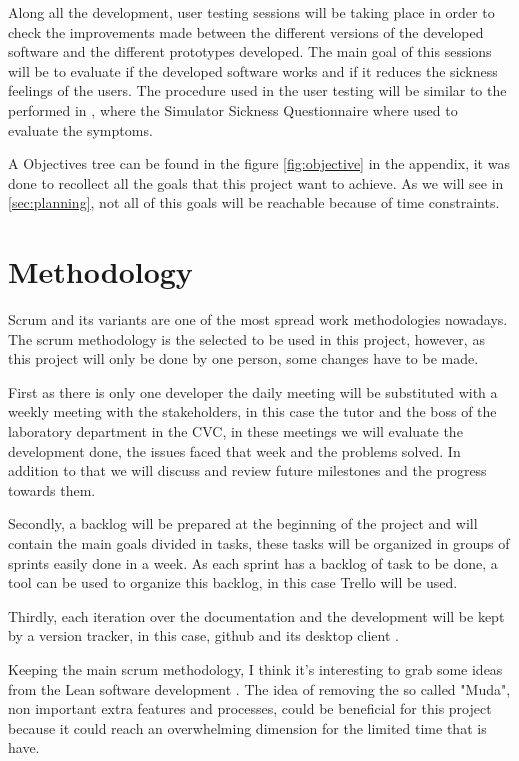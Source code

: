 \documentclass[10pt,a4paper,twocolumn,twoside]{article}
\begin{document}
Along all the development, user testing sessions will be taking place in order to check the improvements made between the different versions of the developed software and the different prototypes developed. The main goal of this sessions will be to evaluate if the developed software works and if it reduces the sickness feelings of the users. The procedure used in the user testing will be similar to the performed in \cite{ifftConfortDoF}, where the Simulator Sickness Questionnaire \cite{ssqQuestion} where used to evaluate the symptoms. 

A Objectives tree can be found in the figure \ref{fig:objective} in the appendix, it was done to recollect all the goals that this project want to achieve. As we will see in \ref{sec:planning}, not all of this goals will be reachable because of time constraints.

\section{Methodology}
Scrum and its variants are one of the most spread work methodologies nowadays.
The scrum methodology is the selected to be used in this project, however, as this project will only be done by one person, some changes have to be made. 

First as there is only one developer the daily meeting will be substituted with a weekly meeting with the stakeholders, in this case the tutor and the boss of the laboratory department in the CVC, in these meetings we will evaluate the development done, the issues faced that week and the problems solved. In addition to that we will discuss and review future milestones and the progress towards them.

Secondly, a backlog will be prepared at the beginning of the project and will contain the main goals divided in tasks, these tasks will be organized in groups of sprints easily done in a week. As each sprint has a backlog of task to be done, a tool can be used to organize this backlog, in this case Trello\cite{web:trello} will be used.

Thirdly, each iteration over the documentation and the development will be kept by a version tracker, in this case, github \cite{web:github} and its desktop client \cite{web:githubDesktop}. 

Keeping the main scrum methodology, I think it's interesting to grab some ideas from the Lean software development \cite{web:leanMethod}. The idea of removing the so called "Muda", non important extra features and processes, could be beneficial for this project because it could reach an overwhelming dimension for the limited time that is have.
\end{document}
